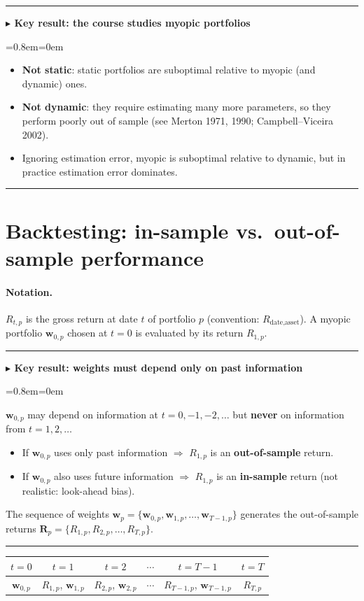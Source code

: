 \documentclass[11pt,a4paper]{report}
\newenvironment{notebox}[1]
  {\par\medskip\Needspace{6\baselineskip}\noindent\rule{\linewidth}{0.4pt}\par\nopagebreak
   \noindent\textbf{#1}\par\nopagebreak
   \begin{list}{}{\leftmargin=0.8em\rightmargin=0em\topsep=2pt}\item[]}
  {\end{list}\nopagebreak\noindent\rule{\linewidth}{0.4pt}\par\medskip}
\newenvironment{keybox}[1][]{\begin{notebox}{$\blacktriangleright$ Key result#1}}{\end{notebox}}
\newcommand{\w}{\bm{w}}
\begin{document}
\begin{keybox}[: the course studies myopic portfolios]
\begin{itemize}
  \item \textbf{Not static}: static portfolios are suboptimal relative to myopic (and dynamic) ones.
  \item \textbf{Not dynamic}: they require estimating many more parameters, so
    they perform poorly out of sample (see Merton 1971, 1990; Campbell--Viceira 2002).
  \item Ignoring estimation error, myopic is suboptimal relative to dynamic,
    but in practice estimation error dominates.
\end{itemize}
\end{keybox}

\section{Backtesting: in-sample vs.\ out-of-sample performance}

\paragraph{Notation.} $R_{t,p}$ is the gross return at date $t$ of portfolio $p$
(convention: $R_{\text{date},\text{asset}}$). A myopic portfolio $\w_{0,p}$
chosen at $t=0$ is evaluated by its return $R_{1,p}$.

\begin{keybox}[: weights must depend only on past information]
$\w_{0,p}$ may depend on information at $t=0,-1,-2,\dots$ but \textbf{never} on
information from $t=1,2,\dots$
\begin{itemize}
  \item If $\w_{0,p}$ uses only past information $\Rightarrow$ $R_{1,p}$ is an
    \textbf{out-of-sample} return.
  \item If $\w_{0,p}$ also uses future information $\Rightarrow$ $R_{1,p}$ is an
    \textbf{in-sample} return (not realistic: look-ahead bias).
\end{itemize}
The sequence of weights $\w_p=\{\w_{0,p},\w_{1,p},\dots,\w_{T-1,p}\}$ generates
the out-of-sample returns $\bm R_p=\{R_{1,p},R_{2,p},\dots,R_{T,p}\}$.
\end{keybox}

\begin{center}
\begin{tabular}{c|c|c|c|c|c}
$t=0$ & $t=1$ & $t=2$ & $\cdots$ & $t=T-1$ & $t=T$\\\hline
$\w_{0,p}$ & $R_{1,p}$, $\w_{1,p}$ & $R_{2,p}$, $\w_{2,p}$ & $\cdots$ & $R_{T-1,p}$, $\w_{T-1,p}$ & $R_{T,p}$
\end{tabular}
\end{center}
\end{document}
